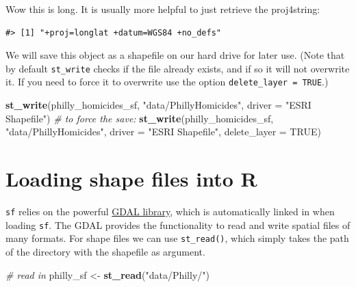 \documentclass[
]{book}
\newenvironment{Shaded}{\begin{snugshade}}{\end{snugshade}}
\newcommand{\AttributeTok}[1]{\textcolor[rgb]{0.13,0.29,0.53}{#1}}
\newcommand{\CommentTok}[1]{\textcolor[rgb]{0.56,0.35,0.01}{\textit{#1}}}
\newcommand{\ConstantTok}[1]{\textcolor[rgb]{0.56,0.35,0.01}{#1}}
\newcommand{\FunctionTok}[1]{\textcolor[rgb]{0.13,0.29,0.53}{\textbf{#1}}}
\newcommand{\NormalTok}[1]{#1}
\newcommand{\OtherTok}[1]{\textcolor[rgb]{0.56,0.35,0.01}{#1}}
\newcommand{\SpecialCharTok}[1]{\textcolor[rgb]{0.81,0.36,0.00}{\textbf{#1}}}
\newcommand{\StringTok}[1]{\textcolor[rgb]{0.31,0.60,0.02}{#1}}
\begin{document}
Wow this is long. It is usually more helpful to just retrieve the proj4string:

\begin{Shaded}
\end{Shaded}

\begin{verbatim}
#> [1] "+proj=longlat +datum=WGS84 +no_defs"
\end{verbatim}

We will save this object as a shapefile on our hard drive for later use. (Note that by default \texttt{st\_write} checks if the file already exists, and if so it will not overwrite it. If you need to force it to overwrite use the option \texttt{delete\_layer\ =\ TRUE}.)

\begin{Shaded}
\begin{Highlighting}[]
\FunctionTok{st\_write}\NormalTok{(philly\_homicides\_sf, }\StringTok{"data/PhillyHomicides"}\NormalTok{, }\AttributeTok{driver =} \StringTok{"ESRI Shapefile"}\NormalTok{)}
\CommentTok{\# to force the save: }
\FunctionTok{st\_write}\NormalTok{(philly\_homicides\_sf, }\StringTok{"data/PhillyHomicides"}\NormalTok{, }\AttributeTok{driver =} \StringTok{"ESRI Shapefile"}\NormalTok{, }\AttributeTok{delete\_layer =} \ConstantTok{TRUE}\NormalTok{)}
\end{Highlighting}
\end{Shaded}

\hypertarget{loading-shape-files-into-r}{%
\section{Loading shape files into R}\label{loading-shape-files-into-r}}

\texttt{sf} relies on the powerful \href{http://gdal.org}{GDAL library}, which is automatically linked in when loading \texttt{sf}. The GDAL provides the functionality to read and write spatial files of many formats. For shape files we can use \texttt{st\_read()}, which simply takes the path of the directory with the shapefile as argument.

\begin{Shaded}
\begin{Highlighting}[]
\CommentTok{\# read in}
\NormalTok{philly\_sf }\OtherTok{\textless{}{-}} \FunctionTok{st\_read}\NormalTok{(}\StringTok{"data/Philly/"}\NormalTok{)}
\end{Highlighting}
\end{Shaded}
\end{document}
